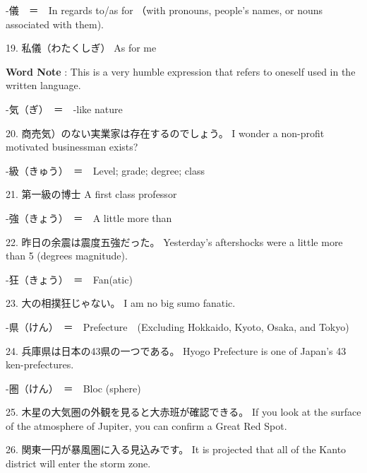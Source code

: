 \par{-儀　＝　In regards to\slash as for （with pronouns, people's names, or nouns associated with them). }

\par{19. 私儀（わたくしぎ） \hfill\break
As for me }

\par{\textbf{Word Note }: This is a very humble expression that refers to oneself used in the written language. }

\par{-気（ぎ）　＝　-like nature }

\par{20. 商売気）のない実業家は存在するのでしょう。 \hfill\break
I wonder a non-profit motivated businessman exists? }

\par{-級（きゅう）　＝　Level; grade; degree; class }

\par{21. 第一級の博士 \hfill\break
A first class professor }

\par{-強（きょう）　＝　A little more than }

\par{22. 昨日の余震は震度五強だった。 \hfill\break
Yesterday's aftershocks were a little more than 5 (degrees magnitude). }

\par{-狂（きょう）　＝　Fan(atic) }

\par{23. 大の相撲狂じゃない。 \hfill\break
I am no big sumo fanatic. }

\par{-県（けん）　＝　Prefecture　(Excluding Hokkaido, Kyoto, Osaka, and Tokyo) }

\par{24. 兵庫県は日本の43県の一つである。 \hfill\break
Hyogo Prefecture is one of Japan's 43 ken-prefectures. }

\par{-圏（けん）　＝　Bloc (sphere) }

\par{25. 木星の大気圏の外観を見ると大赤班が確認できる。 \hfill\break
If you look at the surface of the atmosphere of Jupiter, you can confirm a Great Red Spot. }

\par{26. 関東一円が暴風圏に入る見込みです。 \hfill\break
It is projected that all of the Kanto district will enter the storm zone. }

